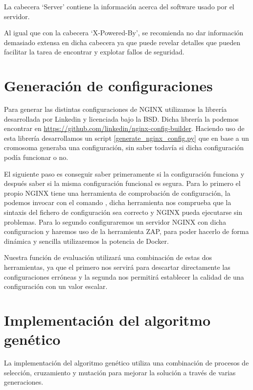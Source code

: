 La cabecera `Server' contiene la información acerca del software usado por el servidor.

\bigskip
Al igual que con la cabecera `X-Powered-By', se recomienda no dar información demasiado extensa en dicha cabecera ya que puede revelar detalles que pueden facilitar la tarea de encontrar y explotar fallos de seguridad.


\section{Generación de configuraciones}

\bigskip
Para generar las distintas configuraciones de NGINX utilizamos la librería  desarrollada por Linkedin y licenciada bajo la BSD. Dicha librería la podemos encontrar en \url{https://github.com/linkedin/nginx-config-builder}. Haciendo uso de esta librería desarrollamos un script \ref{generate_nginx_config.py} que en base a un cromosoma generaba una configuración, sin saber todavía si dicha configuración podía funcionar o no.

\bigskip
El siguiente paso es conseguir saber primeramente si la configuración funciona y después saber si la misma configuración funcional es segura. Para lo primero el propio NGINX tiene una herramienta de comprobación de configuración, la podemos invocar con el comando , dicha herramienta nos comprueba que la sintaxis del fichero de configuración sea correcto y NGINX pueda ejecutarse sin problemas. Para lo segundo configuraremos un servidor NGINX con dicha configuracion y haremos uso de la herramienta ZAP, para poder hacerlo de forma dinámica y sencilla utilizaremos la potencia de Docker.

\bigskip
Nuestra función de evaluación utilizará una combinación de estas dos herramientas, ya que el primero nos servirá para descartar directamente las configuraciones erróneas y la segunda nos permitirá establecer la calidad de una configuración con un valor escalar.

\section{Implementación del algoritmo genético}

La implementación del algoritmo genético utiliza una combinación de procesos de selección, cruzamiento y mutación para mejorar la solución a través de varias generaciones.
\bigskip

